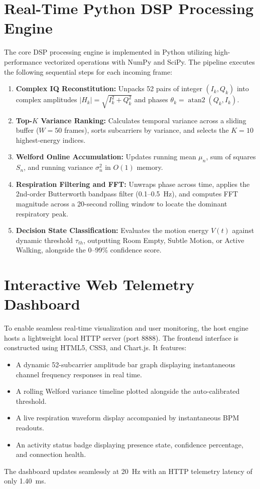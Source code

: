 \section{Real-Time Python DSP Processing Engine}
The core DSP processing engine is implemented in Python utilizing high-performance vectorized operations with NumPy and SciPy. The pipeline executes the following sequential steps for each incoming frame:
\begin{enumerate}
    \item \textbf{Complex IQ Reconstitution:} Unpacks 52 pairs of integer $(I_k, Q_k)$ into complex amplitudes $|H_k| = \sqrt{I_k^2 + Q_k^2}$ and phases $\theta_k = \operatorname{atan2}(Q_k, I_k)$.
    \item \textbf{Top-$K$ Variance Ranking:} Calculates temporal variance across a sliding buffer ($W=50$ frames), sorts subcarriers by variance, and selects the $K=10$ highest-energy indices.
    \item \textbf{Welford Online Accumulation:} Updates running mean $\mu_n$, sum of squares $S_n$, and running variance $\sigma_n^2$ in $O(1)$ memory.
    \item \textbf{Respiration Filtering and FFT:} Unwraps phase across time, applies the 2nd-order Butterworth bandpass filter (0.1--0.5~Hz), and computes FFT magnitude across a 20-second rolling window to locate the dominant respiratory peak.
    \item \textbf{Decision State Classification:} Evaluates the motion energy $V(t)$ against dynamic threshold $\tau_{th}$, outputting Room Empty, Subtle Motion, or Active Walking, alongside the 0--99\% confidence score.
\end{enumerate}

\section{Interactive Web Telemetry Dashboard}
To enable seamless real-time visualization and user monitoring, the host engine hosts a lightweight local HTTP server (port 8888). The frontend interface is constructed using HTML5, CSS3, and Chart.js. It features:
\begin{itemize}
    \item A dynamic 52-subcarrier amplitude bar graph displaying instantaneous channel frequency responses in real time.
    \item A rolling Welford variance timeline plotted alongside the auto-calibrated threshold.
    \item A live respiration waveform display accompanied by instantaneous BPM readouts.
    \item An activity status badge displaying presence state, confidence percentage, and connection health.
\end{itemize}
The dashboard updates seamlessly at 20~Hz with an HTTP telemetry latency of only 1.40~ms.
